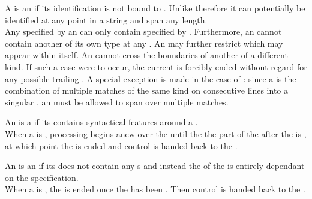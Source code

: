 A  is an  if its identification is not bound to . Unlike  therefore it can potentially be identified at any point in a string and span any length. \\

Any  specified by an  can only contain  specified by . Furthermore, an  cannot contain another  of its own type at any . An  may further restrict which  may appear within itself. An  cannot cross the boundaries of another  of a different kind. If such a case were to occur, the current  is forcibly ended without regard for any possible trailing . A special exception is made in the case of : since a  is the combination of multiple matches of the same kind on consecutive lines into a singular , an  must be allowed to span over multiple matches.

An  is a  if its  contains syntactical features around a . \\

When a  is , processing begins anew over the  until the the part of the  after the  is , at which point the  is ended and control is handed back to the .

An  is an  if its  does not contain any s and instead the  of the  is entirely dependant on the  specification. \\

When a  is , the  is ended once the  has been . Then control is handed back to the .

